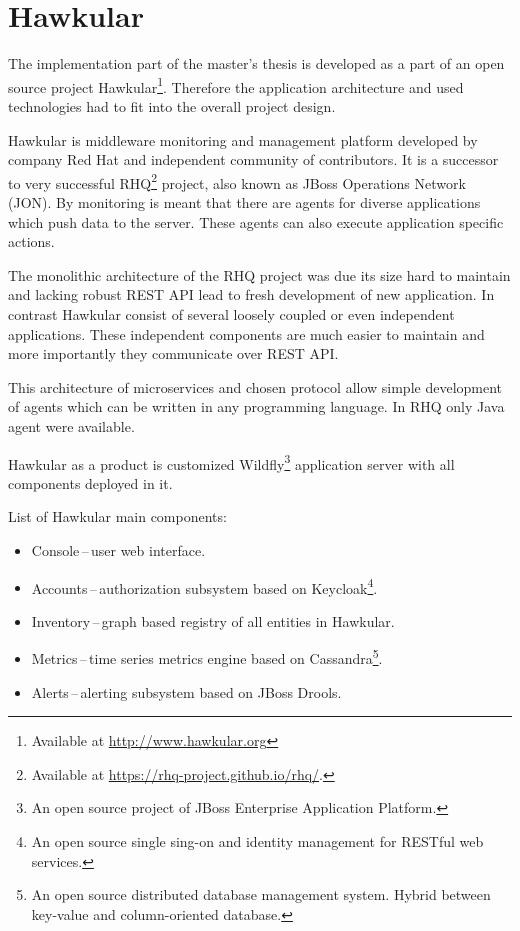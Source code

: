     \section{Hawkular} \label{sec:hawkular}
    The implementation part of the master's thesis is developed as a part of an open source project
    Hawkular\footnote{Available at \url{http://www.hawkular.org}}. Therefore the application architecture and used
    technologies had to fit into the overall project design.

    Hawkular is middleware monitoring and management platform developed by company Red Hat and independent community
    of contributors. It is a successor to very successful RHQ\footnote{Available at
    \url{https://rhq-project.github.io/rhq/}.} project, also known as JBoss Operations Network (JON). By monitoring
    is meant that there are agents for diverse applications which push data to the server. These agents can also
    execute application specific actions.

    The monolithic architecture of the RHQ project was due its size hard to maintain and lacking robust REST API lead to
    fresh development of new application. In contrast Hawkular consist of several loosely coupled or even independent
    applications. These independent components are much easier to maintain and more importantly they communicate over
    REST API.

    This architecture of microservices and chosen protocol allow simple development of agents which can be
    written in any programming language. In RHQ only Java agent were available.

    Hawkular as a product is customized
    Wildfly\footnote{An open source project of JBoss Enterprise Application Platform.} application server with all
    components deployed in it.

    List of Hawkular main components:
    \begin{itemize}
        \item Console\,--\,user web interface.
        \item Accounts\,--\,authorization subsystem based on Keycloak\footnote{An open
            source single sing-on and identity management for RESTful web services.}.
        \item Inventory\,--\,graph based registry of all entities in Hawkular.
        \item Metrics\,--\,time series metrics engine based on Cassandra\footnote{An open
            source distributed database management system. Hybrid between key-value and
        column-oriented database.}.
        \item Alerts\,--\,alerting subsystem based on JBoss Drools.
    \end{itemize}

